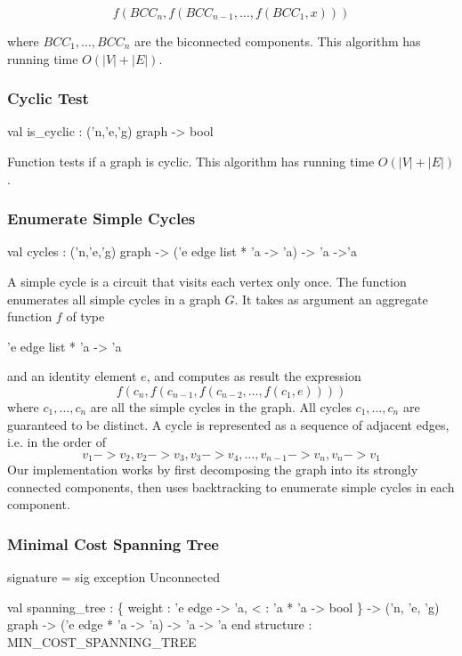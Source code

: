 \[
   f(BCC_n,f(BCC_{n-1},\ldots, f(BCC_1,x))) 
\]

where $BCC_1,\ldots,BCC_n$ are the biconnected components.
This algorithm has running time $O(|V|+|E|)$.

\subsubsection{Cyclic Test}
\begin{SML}
 val is_cyclic : ('n,'e,'g) graph -> bool
\end{SML}
Function  tests if a graph is cyclic.
This algorithm has running time $O(|V|+|E|)$.

\subsubsection{Enumerate Simple Cycles}
\begin{SML}
 val cycles : ('n,'e,'g) graph -> ('e edge list * 'a -> 'a) -> 'a ->'a
\end{SML}
  A simple cycle is a circuit that visits each vertex only once.
  The function  enumerates all simple cycles in a graph $G$.
  It takes as argument an aggregate function $f$ of type 
  \begin{SML}
       'e edge list * 'a -> 'a
  \end{SML}
  and an identity element $e$, and computes as result the expression
  \[
     f(c_n,f(c_{n-1},f(c_{n-2},\ldots, f(c_1,e)))) 
  \]
  where $c_1,\ldots,c_n$ are all the simple cycles in the graph.   
  All cycles $c_1,\ldots,c_n$ are guaranteed to be distinct.  
  A cycle is represented as a sequence of
  adjacent edges, i.e. in the order of 
  \[ 
     v_1 -> v_2, v_2 -> v_3, v_3 -> v_4, \ldots, v_{n-1} -> v_n, v_n -> v_1 
  \]
  Our implementation works by first decomposing the graph into
  its strongly connected components, then uses backtracking to enumerate
  simple cycles in each component.
\subsubsection{Minimal Cost Spanning Tree}
\begin{SML}
 signature  = sig
   exception Unconnected

   val spanning_tree : \{ weight    : 'e edge -> 'a,
                         <         : 'a * 'a -> bool
                       \} -> ('n, 'e, 'g) graph
                         -> ('e edge * 'a -> 'a) -> 'a -> 'a
 end
 structure  : MIN_COST_SPANNING_TREE
\end{SML}

